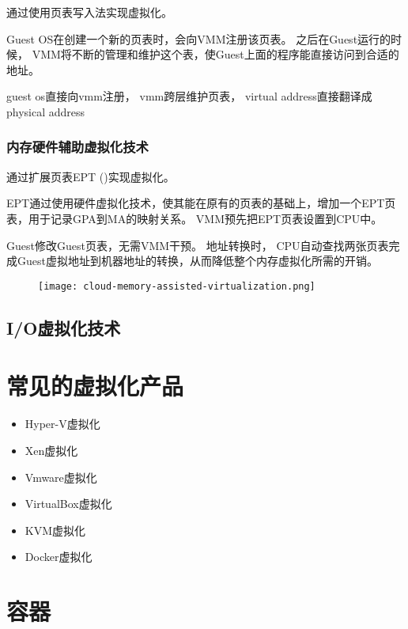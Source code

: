 通过使用页表写入法实现虚拟化。

Guest OS在创建一个新的页表时，会向VMM注册该页表。 之后在Guest运行的时候， VMM将不断的管理和维护这个表，使Guest上面的程序能直接访问到合适的地址。 

guest os直接向vmm注册， vmm跨层维护页表， virtual address直接翻译成physical address

\subsubsection{内存硬件辅助虚拟化技术}

通过扩展页表EPT ()实现虚拟化。 

EPT通过使用硬件虚拟化技术，使其能在原有的页表的基础上，增加一个EPT页表，用于记录GPA到MA的映射关系。 VMM预先把EPT页表设置到CPU中。 

Guest修改Guest页表，无需VMM干预。 地址转换时， CPU自动查找两张页表完成Guest虚拟地址到机器地址的转换，从而降低整个内存虚拟化所需的开销。 

\begin{figure}[htbp]
    \begin{center}
        \texttt{[image: cloud-memory-assisted-virtualization.png]}
    \end{center}
\end{figure}

\subsection{I/O虚拟化技术}


\section{常见的虚拟化产品}

\begin{itemize}
    \item Hyper-V虚拟化
    \item Xen虚拟化
    \item Vmware虚拟化
    \item VirtualBox虚拟化
    \item KVM虚拟化
    \item Docker虚拟化
\end{itemize}


\section{容器}


